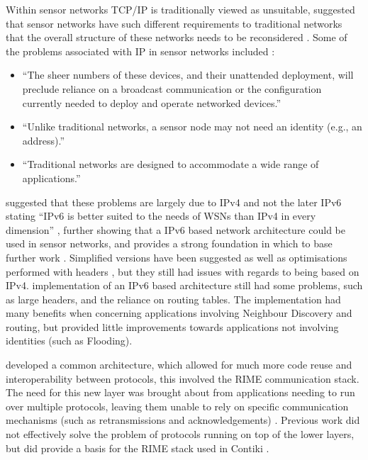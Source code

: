 Within sensor networks TCP/IP is traditionally viewed as unsuitable, \citeauthor{Estrin:1999:NCC:313451.313556} suggested that sensor networks have such different requirements to traditional networks that the overall structure of these networks needs to be reconsidered \cite{Estrin:1999:NCC:313451.313556}. Some of the problems \citeauthor{Estrin:1999:NCC:313451.313556} associated with IP in sensor networks included \cite{Estrin:1999:NCC:313451.313556}:
\begin{itemize}
	\item ``The sheer numbers of these devices, and their unattended deployment, will preclude reliance on a broadcast communication or the conﬁguration currently needed to deploy and operate networked devices.''
	\item ``Unlike traditional networks, a sensor node may not need an identity (e.g., an address).''
	\item ``Traditional networks are designed to accommodate a wide range of applications.''
\end{itemize}
\citeauthor{Hui:2008:IDL:1460412.1460415} suggested that these problems are largely due to IPv4 and not the later IPv6 stating ``IPv6 is better suited to the needs of WSNs than IPv4 in every dimension'' \cite{Hui:2008:IDL:1460412.1460415}, further showing that a IPv6 based network architecture could be used in sensor networks, and provides a strong foundation in which to base further work \cite{Durvy:2008:MSN:1460412.1460483}. Simplified versions have been suggested as well as optimisations performed with headers \cite{Dunkels:2003:FTA:1066116.1066118,Dunkels04makingtcp/ip}, but they still had issues with regards to being based on IPv4.  \citeauthor{Estrin:1999:NCC:313451.313556} implementation of an IPv6 based architecture still had some problems, such as large headers, and the reliance on routing tables. The implementation had many benefits when concerning applications involving Neighbour Discovery and routing, but provided little improvements towards applications not involving identities (such as Flooding).

\citeauthor{Dunkels:2007:ACA:1322263.1322295} developed a common architecture, which allowed for much more code reuse and interoperability between protocols, this involved the RIME communication stack. The need for this new layer was brought about from applications needing to run over multiple protocols, leaving them unable to rely on specific communication mechanisms (such as retransmissions and acknowledgements) \cite{Dunkels:2007:ACA:1322263.1322295}. Previous work \cite{Ee:2006:MNL:1298455.1298479,Polastre:2005:ULA:1098918.1098928} did not effectively solve the problem of protocols running on top of the lower layers, but did provide a basis for the RIME stack used in Contiki \cite{Dunkels:2007:ACA:1322263.1322295}. 

